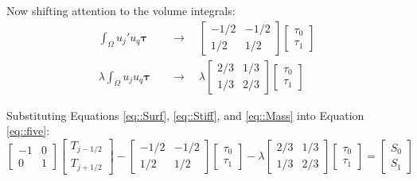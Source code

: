 \documentclass{article}
\def\ds{\displaystyle}
\begin{document}
Now shifting attention to the volume integrals:
\begin{align}
\label{eq::Stiff}
\ds\int_\Omega u_{j}'u_q \bm\tau \quad &\to \quad \begin{bmatrix} -1/2 & -1/2 \\ 1/2 & 1/2  \end{bmatrix} \begin{bmatrix} \tau_0 \\ \tau_1 \end{bmatrix} \\[5pt]
\label{eq::Mass}
\lambda\ds\int_\Omega u_{j}u_q \bm\tau \quad &\to \quad \lambda\begin{bmatrix} 2/3 & 1/3 \\ 1/3 & 2/3  \end{bmatrix} \begin{bmatrix} \tau_0 \\ \tau_1 \end{bmatrix}
\end{align}

Substituting Equations \ref{eq::Surf}, \ref{eq::Stiff}, and \ref{eq::Mass} into Equation \ref{eq::five}:
\begin{equation}
\label{eq::Almost}
\begin{bmatrix} -1 & 0 \\ 0 & 1 \end{bmatrix} \begin{bmatrix} T_{j-1/2}  \\ T_{j+1/2}  \end{bmatrix} - \begin{bmatrix} -1/2 & -1/2 \\ 1/2 & 1/2  \end{bmatrix} \begin{bmatrix} \tau_0 \\ \tau_1 \end{bmatrix} - \lambda\begin{bmatrix} 2/3 & 1/3 \\ 1/3 & 2/3  \end{bmatrix} \begin{bmatrix} \tau_0 \\ \tau_1 \end{bmatrix} = \begin{bmatrix} S_0 \\ S_1 \end{bmatrix}
\end{equation}
\end{document}
